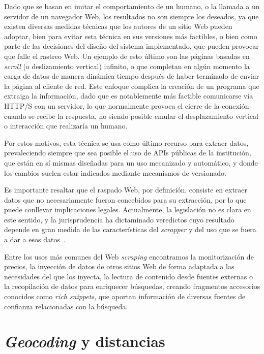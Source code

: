 Dado que se basan en imitar el comportamiento de un humano, o la llamada a un servidor de un navegador Web, los resultados no son siempre los deseados, ya que existen diversas medidas técnicas que los autores de un sitio Web pueden adoptar, bien para evitar esta técnica en sus versiones más factibles, o bien como parte de las decisiones del diseño del sistema implementado, que pueden provocar que falle el rastreo Web. Un ejemplo de esto último son las páginas basadas en \textit{scroll} (o deslizamiento vertical) infinito, o que completan en algún momento la carga de datos de manera dinámica tiempo después de haber terminado de enviar la página al cliente de red. Este enfoque complica la creación de un programa que extraiga la información, dado que es notablemente más factible comunicarse vía HTTP/S con un servidor, lo que normalmente provoca el cierre de la conexión cuando se recibe la respuesta, no siendo posible emular el desplazamiento vertical o interacción que realizaría un humano.

Por estos motivos, esta técnica se usa como último recurso para extraer datos, prevaleciendo siempre que sea posible el uso de APIs públicas de la institución, que están en sí mismas diseñadas para un uso mecanizado y automático, y donde los cambios suelen estar indicados mediante mecanismos de versionado.

Es importante resaltar que el raspado Web, por definición, consiste en extraer datos que no necesariamente fueron concebidos para su extracción, por lo que puede conllevar implicaciones legales. Actualmente, la legislación no es clara en este sentido, y la jurisprudencia ha dictaminado veredictos cuyo resultado depende en gran medida de las características del \textit{scrapper} y del uso que se fuera a dar a esos datos~\cite{scraping_legal, ryanair}.

Entre los usos más comunes del Web \textit{scraping} encontramos la monitorización de precios, la inyección de datos de otros sitios Web de forma adaptada a las necesidades del que los inyecta, la lectura de contenido desde fuentes externas o la recopilación de datos para enriquecer búsquedas, creando fragmentos accesorios conocidos como \textit{rich snippets}, que aportan información de diversas fuentes de confianza relacionadas con la búsqueda.

\section{\textit{Geocoding} y distancias}

